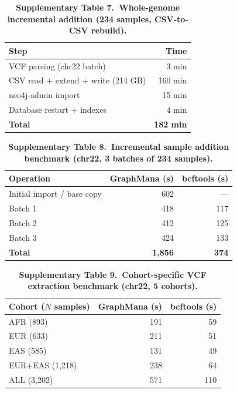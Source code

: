 \documentclass[11pt,a4paper]{article}
\begin{document}
\begin{table}[p]
\centering
\caption*{\textbf{Supplementary Table 7.~Whole-genome incremental addition (234 samples, CSV-to-CSV rebuild).}}
\vspace{0.5em}
\begin{tabular}{@{}lr@{}}
\toprule
Step & Time \\
\midrule
VCF parsing (chr22 batch) & 3 min \\
CSV read + extend + write (214 GB) & 160 min \\
neo4j-admin import & 15 min \\
Database restart + indexes & 4 min \\
\textbf{Total} & \textbf{182 min} \\
\bottomrule
\end{tabular}
\end{table}

\clearpage

\begin{table}[p]
\centering
\caption*{\textbf{Supplementary Table 8.~Incremental sample addition benchmark (chr22, 3 batches of 234 samples).}}
\vspace{0.5em}
\begin{tabular}{@{}lrr@{}}
\toprule
Operation & GraphMana (s) & bcftools (s) \\
\midrule
Initial import / base copy & 602 & --- \\
Batch 1 & 418 & 117 \\
Batch 2 & 412 & 125 \\
Batch 3 & 424 & 133 \\
\textbf{Total} & \textbf{1,856} & \textbf{374} \\
\bottomrule
\end{tabular}
\end{table}

\clearpage

\begin{table}[p]
\centering
\caption*{\textbf{Supplementary Table 9.~Cohort-specific VCF extraction benchmark (chr22, 5 cohorts).}}
\vspace{0.5em}
\begin{tabular}{@{}lrr@{}}
\toprule
Cohort ($N$ samples) & GraphMana (s) & bcftools (s) \\
\midrule
AFR (893) & 191 & 59 \\
EUR (633) & 211 & 51 \\
EAS (585) & 131 & 49 \\
EUR+EAS (1,218) & 238 & 64 \\
ALL (3,202) & 571 & 110 \\
\bottomrule
\end{tabular}
\end{table}
\end{document}
